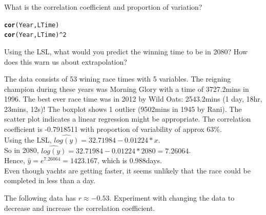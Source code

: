 \documentclass[bigtut]{tutorial}\usepackage[]{graphicx}\usepackage[]{color}
\makeatletter
\newcommand{\hlnum}[1]{\textcolor[rgb]{0.686,0.059,0.569}{#1}}%
\newcommand{\hlopt}[1]{\textcolor[rgb]{0,0,0}{#1}}%
\newcommand{\hlstd}[1]{\textcolor[rgb]{0.345,0.345,0.345}{#1}}%
\newcommand{\hlkwd}[1]{\textcolor[rgb]{0.737,0.353,0.396}{\textbf{#1}}}%
\newenvironment{kframe}{%
 \def\at@end@of@kframe{}%
 \ifinner\ifhmode%
  \def\at@end@of@kframe{\end{minipage}}%
  \begin{minipage}{\columnwidth}%
 \fi\fi%
 \def\FrameCommand##1{\hskip\@totalleftmargin \hskip-\fboxsep
 \colorbox{shadecolor}{##1}\hskip-\fboxsep
     \hskip-\linewidth \hskip-\@totalleftmargin \hskip\columnwidth}%
 \MakeFramed {\advance\hsize-\width
   \@totalleftmargin\z@ \linewidth\hsize
   \@setminipage}}%
 {\par\unskip\endMakeFramed%
 \at@end@of@kframe}
\newenvironment{knitrout}{}{} %
\makeatother
\begin{document}
\begin{tutorial}
\begin{questions}
\begin{parts}
\vspace{.5cm}
\item What is the correlation coefficient and proportion of variation?
\begin{knitrout}
\color{fgcolor}\begin{kframe}
\begin{alltt}
\hlkwd{cor}\hlstd{(Year,LTime)}
\hlkwd{cor}\hlstd{(Year,LTime)}\hlopt{^}\hlnum{2}
\end{alltt}
\end{kframe}
\end{knitrout}

\vspace{.5cm}
\item Using the LSL, what would you predict the winning time to be in 2080? How does this warn us about extrapolation?

\end{parts}

\begin{solution}
The data consists of 53 wining race times with 5 variables. The reigning champion during these years was Morning Glory with a time of 3727.2mins in 1996. The best ever race time was in 2012 by Wild Oats: 2543.2mins (1 day, 18hr, 23mins, 12s)! The boxplot shows 1 outlier (9502mins in 1945 by Rani). The scatter plot indicates a linear regression might be appropriate. The correlation coefficient is -0.7918511 with proportion of variability of approx 63\%. \\

Using the LSL,
$\hat{log(y)} = 32.71984 -0.01224*x$.\\
So in 2080, $\hat{log(y)} = 32.71984 -0.01224*2080 = 7.26064$. \\
Hence, $\hat{y} = e^{7.26064} = 1423.167$, which is 0.988days. \\
Even though yachts are getting faster, it seems unlikely that the race could be completed in less than a day.
\end{solution} 


\vspace{.5cm}
\question
The following data has $r \approx -0.53$. Experiment with changing the data to decrease and increase the correlation coefficient.


\end{questions}
\end{tutorial}
\end{document}
